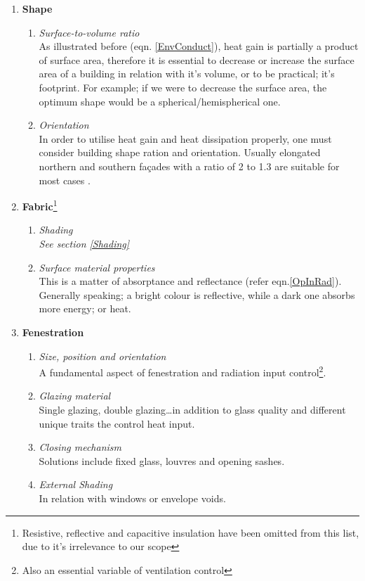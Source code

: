 \begin{enumerate}
  \item \textbf{Shape}
  	\begin{enumerate}
    	\item \emph{Surface-to-volume ratio}\\ As illustrated before (eqn. \ref{EnvConduct}), heat gain is partially a product of surface area, therefore it is essential to decrease or increase the surface area of a building in relation with it's volume, or to be practical; it's footprint.  For example; if we were to decrease the surface area, the optimum shape would be a spherical/hemispherical one. 
    	\item \emph{Orientation}\\ In order to utilise heat gain and heat dissipation properly, one
    	must consider building shape ration and orientation. Usually elongated northern and southern
    	fa\c{c}ades with a ratio of 2 to 1.3 are suitable for most cases \cite{szokolay08}.
  	\end{enumerate}
  \item \textbf{Fabric}\footnote{Resistive, reflective and capacitive insulation have been omitted from this list, due to it's irrelevance to our scope}
  	\begin{enumerate}
    	\item \emph{Shading}\\ \emph{See section \ref{Shading}}
    	\item \emph{Surface material properties}\\ This is a matter of absorptance and reflectance (refer eqn.\ref{OpInRad}). Generally speaking; a bright colour is reflective, while a dark one absorbs more energy; or heat.
  \end{enumerate}
  \item \textbf{Fenestration}
  	\begin{enumerate}
  	  \item \emph{Size, position and orientation}\\ A fundamental aspect of fenestration and radiation input control\footnote{Also an essential variable of ventilation control}.
  	  \item \emph{Glazing material}\\ Single glazing, double glazing\ldots in addition to glass quality and different unique traits the control heat input.
  	  \item \emph{Closing mechanism}\\ Solutions include fixed glass, louvres and opening sashes.
  	  \item \emph{External Shading}\\ In relation with windows or envelope voids.
  	\end{enumerate}
\end{enumerate}

